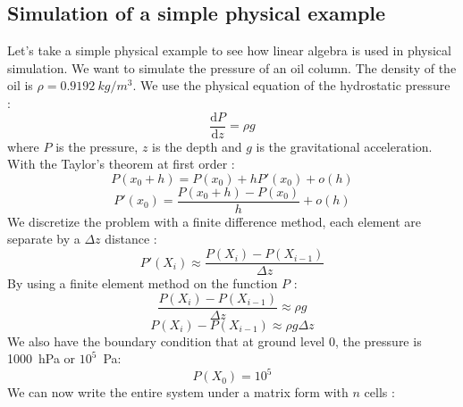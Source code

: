 \subsection{Simulation of a simple physical example}
Let's take a simple physical example to see how linear algebra is used in physical simulation.
%
We want to simulate the pressure of an oil column.
%
The density of the oil is $\rho = 0.9192~kg/m^3$.
%
We use the physical equation of the hydrostatic pressure :
%
\begin{equation}
\frac{\mathrm d P}{\mathrm d z} = \rho{}g
\end{equation}
%
where $P$ is the pressure, $z$ is the depth and $g$ is the gravitational acceleration.
%
With the Taylor's theorem at first order :
%
\begin{equation}
P(x_0+h) = P(x_0) + h P'(x_0) + o(h)
\end{equation}
\begin{equation}
P'(x_0) = \frac{P(x_0+h) - P(x_0)}{h} + o(h)
\end{equation}
%
We discretize the problem with a finite difference method, each element are separate by a $\Delta{z}$ distance :
%
\begin{equation}
P'(X_i) \approx \frac{P(X_{i}) - P(X_{i-1})}{\Delta{z}}
\end{equation}
%
By using a finite element method on the function $P$ :
%
\begin{equation}
\frac{P(X_{i}) - P(X_{i-1})}{\Delta{z}} \approx \rho{}g
\end{equation}
\begin{equation}
\label{eq:system_pressure}
P(X_{i}) - P(X_{i-1}) \approx \rho{}g\Delta{z}
\end{equation}
We also have the boundary condition that at ground level 0, the pressure is 1000~hPa or $10^5$~Pa:
%
\begin{equation}
P(X_0) = 10^5
\end{equation}
%
We can now write the entire system under a matrix form with $n$ cells :
%
